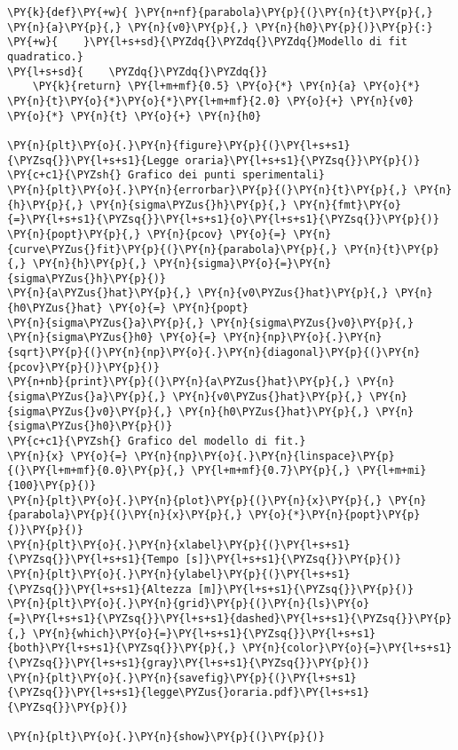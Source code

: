\begin{Verbatim}[label=\makebox{\href{https://github.com/unipi-physics-labs/lab1-sheets/tree/main/snippy/dad_caduta.py}{https://github.com/.../dad\_caduta.py}},commandchars=\\\{\}]
\PY{k}{def}\PY{+w}{ }\PY{n+nf}{parabola}\PY{p}{(}\PY{n}{t}\PY{p}{,} \PY{n}{a}\PY{p}{,} \PY{n}{v0}\PY{p}{,} \PY{n}{h0}\PY{p}{)}\PY{p}{:}
\PY{+w}{    }\PY{l+s+sd}{\PYZdq{}\PYZdq{}\PYZdq{}Modello di fit quadratico.}
\PY{l+s+sd}{    \PYZdq{}\PYZdq{}\PYZdq{}}
    \PY{k}{return} \PY{l+m+mf}{0.5} \PY{o}{*} \PY{n}{a} \PY{o}{*} \PY{n}{t}\PY{o}{*}\PY{o}{*}\PY{l+m+mf}{2.0} \PY{o}{+} \PY{n}{v0} \PY{o}{*} \PY{n}{t} \PY{o}{+} \PY{n}{h0}

\PY{n}{plt}\PY{o}{.}\PY{n}{figure}\PY{p}{(}\PY{l+s+s1}{\PYZsq{}}\PY{l+s+s1}{Legge oraria}\PY{l+s+s1}{\PYZsq{}}\PY{p}{)}
\PY{c+c1}{\PYZsh{} Grafico dei punti sperimentali}
\PY{n}{plt}\PY{o}{.}\PY{n}{errorbar}\PY{p}{(}\PY{n}{t}\PY{p}{,} \PY{n}{h}\PY{p}{,} \PY{n}{sigma\PYZus{}h}\PY{p}{,} \PY{n}{fmt}\PY{o}{=}\PY{l+s+s1}{\PYZsq{}}\PY{l+s+s1}{o}\PY{l+s+s1}{\PYZsq{}}\PY{p}{)}
\PY{n}{popt}\PY{p}{,} \PY{n}{pcov} \PY{o}{=} \PY{n}{curve\PYZus{}fit}\PY{p}{(}\PY{n}{parabola}\PY{p}{,} \PY{n}{t}\PY{p}{,} \PY{n}{h}\PY{p}{,} \PY{n}{sigma}\PY{o}{=}\PY{n}{sigma\PYZus{}h}\PY{p}{)}
\PY{n}{a\PYZus{}hat}\PY{p}{,} \PY{n}{v0\PYZus{}hat}\PY{p}{,} \PY{n}{h0\PYZus{}hat} \PY{o}{=} \PY{n}{popt}
\PY{n}{sigma\PYZus{}a}\PY{p}{,} \PY{n}{sigma\PYZus{}v0}\PY{p}{,} \PY{n}{sigma\PYZus{}h0} \PY{o}{=} \PY{n}{np}\PY{o}{.}\PY{n}{sqrt}\PY{p}{(}\PY{n}{np}\PY{o}{.}\PY{n}{diagonal}\PY{p}{(}\PY{n}{pcov}\PY{p}{)}\PY{p}{)}
\PY{n+nb}{print}\PY{p}{(}\PY{n}{a\PYZus{}hat}\PY{p}{,} \PY{n}{sigma\PYZus{}a}\PY{p}{,} \PY{n}{v0\PYZus{}hat}\PY{p}{,} \PY{n}{sigma\PYZus{}v0}\PY{p}{,} \PY{n}{h0\PYZus{}hat}\PY{p}{,} \PY{n}{sigma\PYZus{}h0}\PY{p}{)}
\PY{c+c1}{\PYZsh{} Grafico del modello di fit.}
\PY{n}{x} \PY{o}{=} \PY{n}{np}\PY{o}{.}\PY{n}{linspace}\PY{p}{(}\PY{l+m+mf}{0.0}\PY{p}{,} \PY{l+m+mf}{0.7}\PY{p}{,} \PY{l+m+mi}{100}\PY{p}{)}
\PY{n}{plt}\PY{o}{.}\PY{n}{plot}\PY{p}{(}\PY{n}{x}\PY{p}{,} \PY{n}{parabola}\PY{p}{(}\PY{n}{x}\PY{p}{,} \PY{o}{*}\PY{n}{popt}\PY{p}{)}\PY{p}{)}
\PY{n}{plt}\PY{o}{.}\PY{n}{xlabel}\PY{p}{(}\PY{l+s+s1}{\PYZsq{}}\PY{l+s+s1}{Tempo [s]}\PY{l+s+s1}{\PYZsq{}}\PY{p}{)}
\PY{n}{plt}\PY{o}{.}\PY{n}{ylabel}\PY{p}{(}\PY{l+s+s1}{\PYZsq{}}\PY{l+s+s1}{Altezza [m]}\PY{l+s+s1}{\PYZsq{}}\PY{p}{)}
\PY{n}{plt}\PY{o}{.}\PY{n}{grid}\PY{p}{(}\PY{n}{ls}\PY{o}{=}\PY{l+s+s1}{\PYZsq{}}\PY{l+s+s1}{dashed}\PY{l+s+s1}{\PYZsq{}}\PY{p}{,} \PY{n}{which}\PY{o}{=}\PY{l+s+s1}{\PYZsq{}}\PY{l+s+s1}{both}\PY{l+s+s1}{\PYZsq{}}\PY{p}{,} \PY{n}{color}\PY{o}{=}\PY{l+s+s1}{\PYZsq{}}\PY{l+s+s1}{gray}\PY{l+s+s1}{\PYZsq{}}\PY{p}{)}
\PY{n}{plt}\PY{o}{.}\PY{n}{savefig}\PY{p}{(}\PY{l+s+s1}{\PYZsq{}}\PY{l+s+s1}{legge\PYZus{}oraria.pdf}\PY{l+s+s1}{\PYZsq{}}\PY{p}{)}

\PY{n}{plt}\PY{o}{.}\PY{n}{show}\PY{p}{(}\PY{p}{)}
\end{Verbatim}

